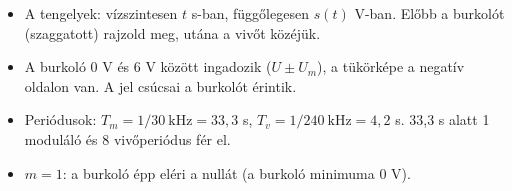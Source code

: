 \begin{rajz}
\begin{center}
\end{center}
\begin{itemize}
\item A tengelyek: vízszintesen $t$ \textmu{}s-ban, függőlegesen $s(t)$ V-ban. Előbb a burkolót (szaggatott) rajzold meg, utána a vivőt közéjük.
\item A burkoló $0$ V és $6$ V között ingadozik ($U\pm U_m$), a tükörképe a negatív oldalon van. A jel csúcsai a burkolót érintik.
\item Periódusok: $T_m=1/30\ \text{kHz}=33,3$ \textmu{}s, $T_v=1/240\ \text{kHz}=4,2$ \textmu{}s. 33,3 \textmu{}s alatt 1 moduláló és 8 vivőperiódus fér el.
\item $m=1$: a burkoló épp eléri a nullát (a burkoló minimuma 0 V).
\end{itemize}


\end{rajz}
